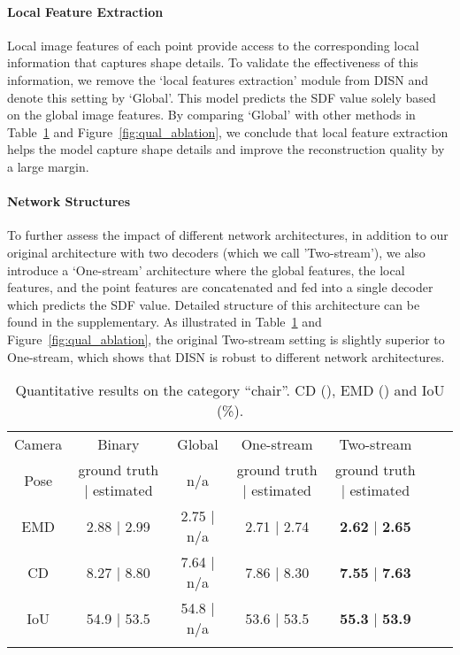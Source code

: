 \paragraph{Local Feature Extraction}
Local image features of each point provide access to the corresponding local information that captures shape details. To validate the effectiveness of this information, we remove the `local features extraction' module from DISN and denote this setting by `Global'. This model predicts the SDF value solely based on the global image features. By comparing `Global' with other methods in Table~\ref{tab:quant_ablation} and Figure~\ref{fig:qual_ablation}, we conclude that local feature extraction helps the model capture shape details and improve the reconstruction quality by a large margin. 
\vspace{-5pt}

\paragraph{Network Structures}
To further assess the impact of different network architectures, in addition to our original architecture with two decoders (which we call 'Two-stream'), we also introduce a `One-stream' architecture where the global features, the local features, and the point features are concatenated and fed into a single decoder which predicts the SDF value. Detailed structure of this architecture can be found in the supplementary. As illustrated in Table~\ref{tab:quant_ablation} and Figure~\ref{fig:qual_ablation}, the original Two-stream setting is slightly superior to One-stream, which shows that DISN is robust to different network architectures.



\begin{table}[!hbt]
\begin{adjustwidth}{-8pt}{0pt}
\setlength\tabcolsep{6pt} \begin{tabular}{c|cccccc}
\Xhline{2\arrayrulewidth}
Camera &  Binary & Global & One-stream  & Two-stream \\
 Pose &   ground truth | estimated &  n/a   &     ground truth | estimated  &             ground truth | estimated \\\hline
EMD &   2.88 | 2.99 &   2.75 | n/a &   2.71 | 2.74 &  \textbf{2.62} | \textbf{2.65}  \\ \hline
CD  &   8.27 | 8.80 &   7.64 | n/a &   7.86 | 8.30 &  \textbf{7.55} | \textbf{7.63}    \\ \hline
IoU &   54.9 | 53.5 &   54.8 | n/a &   53.6 | 53.5 &  \textbf{55.3} | \textbf{53.9}    \\ 
\Xhline{2\arrayrulewidth}
\end{tabular}
\vspace{3pt}
\caption {Quantitative results on the category ``chair''. CD (), EMD () and IoU (\%).
}
\label{tab:quant_ablation}
\vspace{-20pt}
\end{adjustwidth}
\end{table}

